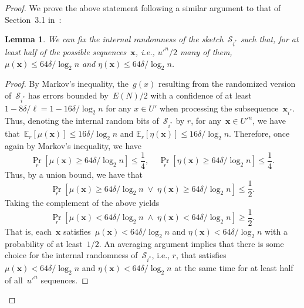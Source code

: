 \documentclass[sigconf]{acmart}
\newtheorem{lemma}[theorem]{Lemma}
\begin{document}
\begin{proof}
    We prove the above statement following a similar argument to that of
    Section~3.1 in~\cite{PaghExpandability}:
    \begin{lemma}
        \label{lemma:derandomization}
        We can fix the internal randomness of the sketch~$\mathcal{S}_{i^*}$
        such that, for at least half of the possible sequences~$\mathbf{x}$,
        i.e., ${u'}^n/2$ many of them, $\mu(\mathbf{x}) \leq 64\delta/\log_2 n$
        and $\eta(\mathbf{x}) \leq 64\delta/\log_2 n$.
    \end{lemma}
    \begin{proof}
        By Markov's inequality, the~$g(x)$ resulting from the randomized
        version of~$\mathcal{S}_{i^*}$ has errors bounded by~$E(N)/2$ with a
        confidence of at least~$1-8\delta/\ell=1-16\delta/\log_2 n$ for any $x
        \in U'$ when processing the subsequence~$\mathbf{x}_{i^*}$. Thus,
        denoting the internal random bits of~$\mathcal{S}_{i^*}$ by $r$, for
        any~$\mathbf{x} \in {U'}^n$, we have that~$\mathbb{E}_r\left[ 
        \mu(\mathbf{x}) \right] \leq 16\delta/\log_2 n$ and 
        $\mathbb{E}_r\left[ \eta(\mathbf{x}) \right] \leq 16\delta/\log_2 n$.
        Therefore, once again by Markov's inequality, we have
        $$ \Pr_r\left[ \mu(\mathbf{x}) \geq 64\delta/\log_2 n \right] \leq \frac{1}{4}, \;\;\;\; \Pr_r\left[ \eta(\mathbf{x}) \geq 64\delta/\log_2 n \right] \leq \frac{1}{4}. $$
        Thus, by a union bound, we have that 
        $$ \Pr_r\left[ \mu(\mathbf{x}) \geq 64\delta/\log_2 n \;\vee\; \eta(\mathbf{x}) \geq 64\delta/\log_2 n \right] \leq \frac{1}{2}. $$
        Taking the complement of the above yields 
        $$ \Pr_r\left[ \mu(\mathbf{x}) < 64\delta/\log_2 n \;\wedge\; \eta(\mathbf{x}) < 64\delta/\log_2 n \right] \geq \frac{1}{2}. $$
        That is, each~$\mathbf{x}$ satisfies~$\mu(\mathbf{x}) < 64\delta/\log_2
        n$ and $\eta(\mathbf{x}) < 64\delta/\log_2 n$ with a probability of at
        least~$1/2$. An averaging argument implies that there is some choice
        for the internal randomness of~$\mathcal{S}_{i^*}$, i.e., $r$, that
        satisfies~$\mu(\mathbf{x}) < 64\delta/\log_2 n$ and $\eta(\mathbf{x}) <
        64\delta/\log_2 n$ at the same time for at least half of all~${u'}^n$
        sequences.
    \end{proof}


\end{proof}
\end{document}
